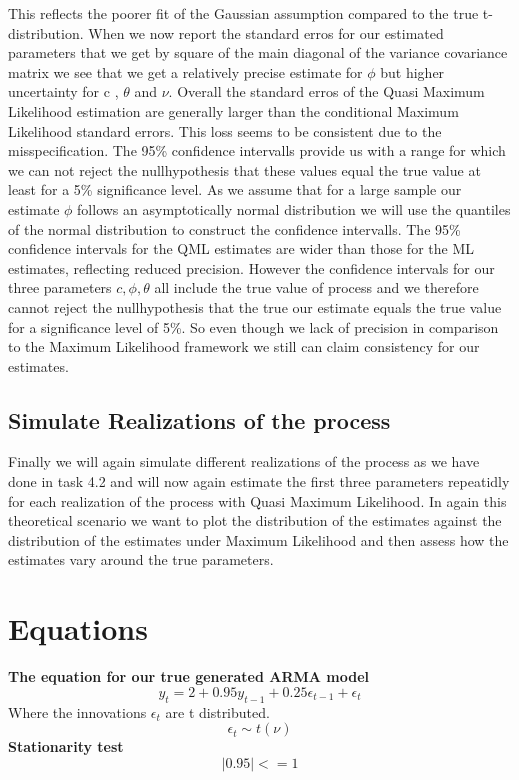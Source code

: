 \documentclass[12pt]{article}
\begin{document}
This reflects the poorer fit of the Gaussian assumption compared to the true t-distribution.
When we now report the standard erros for our estimated parameters that we get by square of the main diagonal of the variance covariance matrix we see that we get a relatively precise estimate for $\phi$ but higher uncertainty for c , $\theta$ and $\nu$.
Overall the standard erros of the Quasi Maximum Likelihood estimation are generally larger than the conditional Maximum Likelihood standard errors. This loss seems to be consistent due to the misspecification.
The 95\% confidence intervalls provide us with a range for which we can not reject the nullhypothesis that these values equal the true value at least for a 5\% significance level.
As we assume that for a large sample our estimate $\phi$ follows an asymptotically normal distribution we will use the quantiles of the normal distribution to construct the confidence intervalls.
The 95\% confidence intervals for the QML estimates are wider than those for the ML estimates, reflecting reduced precision.
However the confidence intervals for our three parameters $c, \phi, \theta$ all include the true value of process and we therefore cannot reject the nullhypothesis that the true our estimate equals the true value for a significance level of 5\%.
So even though we lack of precision in comparison to the Maximum Likelihood framework we still can claim consistency for our estimates.
\subsection{Simulate Realizations of the process}
Finally we will again simulate different realizations of the process as we have done in task 4.2 and will now again estimate the first three parameters repeatidly for each realization of the process with Quasi Maximum Likelihood. In again this theoretical scenario we want to plot the distribution of the estimates against the distribution of the estimates under Maximum Likelihood and then assess how the estimates vary around the true parameters.







\newpage
\section{Equations}
\textbf{The equation for our true generated ARMA model}
\begin{equation}
    y_t = 2 + 0.95y_{t-1} + 0.25\epsilon_{t-1} + \epsilon_t
\label{eq:arma}
\end{equation}
Where the innovations $\epsilon_t$ are t distributed.
 \begin{equation}
     \epsilon_t \sim t(\nu) 
 \end{equation}
\textbf{Stationarity test}
\begin{equation}
    |0.95| <= 1
    \label{eq:stat}
\end{equation}
\end{document}
